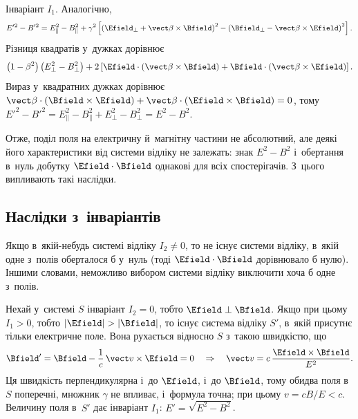 Інваріант $I_1$. Аналогічно,
\begin{equation*}
	E'^2 - B'^2 = E_\parallel^2 - B_\parallel^2 + \gamma^2\left[\left(\Efield_\perp +
	\vect\beta\times\Bfield\right)^2 - \left(\Bfield_\perp -
	\vect\beta\times\Efield\right)^2\right].
\end{equation*}
Різниця квадратів у~дужках дорівнює
\begin{equation*}
	\left(1-\beta^2\right)\left(E_\perp^2 - B_\perp^2\right) +
	2\left[\Efield\cdot(\vect\beta\times\Bfield) +
	\Bfield\cdot(\vect\beta\times\Efield)\right].
\end{equation*}
Вираз у~квадратних дужках дорівнює $\vect\beta\cdot(\Bfield\times\Efield) +
\vect\beta\cdot(\Efield\times\Bfield) = 0$, тому $E'^2 - B'^2 = E_\parallel^2 -
B_\parallel^2 + E_\perp^2 - B_\perp^2 = E^2 - B^2$.

Отже, поділ поля на електричну й~магнітну частини не абсолютний, але деякі його характеристики від
системи відліку не залежать: знак $E^2-B^2$ і~обертання в~нуль добутку $\Efield\cdot\Bfield$ однакові для
всіх спостерігачів. З~цього випливають такі наслідки.

\subsection*{Наслідки з~інваріантів}

Якщо в~якій-небудь системі відліку $I_2 \neq 0$, то не існує системи відліку, в~якій одне
з~полів оберталося б у~нуль (тоді $\Efield\cdot\Bfield$ дорівнювало б нулю). Іншими
словами, неможливо вибором системи відліку виключити хоча б одне з~полів.

Нехай у~системі $S$ інваріант $I_2 = 0$, тобто $\Efield\perp\Bfield$. Якщо при цьому $I_1
> 0$, тобто $|\Efield| > |\Bfield|$, то існує система відліку $S'$, в~якій присутнє тільки
електричне поле. Вона рухається відносно $S$ з~такою швидкістю, що
\begin{equation*}
	\Bfield' = \Bfield - \frac1c\,\vect v\times\Efield = 0 \quad\Rightarrow\quad \vect v =
	c\,\frac{\Efield\times\Bfield}{E^2}.
\end{equation*}
Ця швидкість перпендикулярна і~до $\Efield$, і~до $\Bfield$, тому обидва поля в~$S$
поперечні, множник $\gamma$ не впливає, і~формула точна; при цьому
$v = cB/E < c$. Величину поля в~$S'$ дає інваріант $I_1$: $E' = \sqrt{E^2 - B^2}$.

